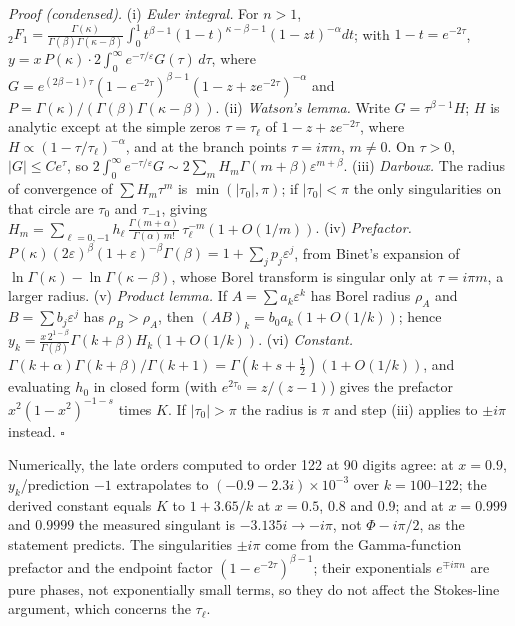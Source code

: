 \documentclass[aps,prd,onecolumn,superscriptaddress,nofootinbib,10pt]{revtex4-2}
\newcommand{\eps}{\varepsilon}
\begin{document}
\emph{Proof (condensed).} (i) \emph{Euler integral.} For $n > 1$,
${}_2F_1 = \frac{\Gamma(\kappa)}{\Gamma(\beta)\Gamma(\kappa-\beta)}\int_0^1 t^{\beta-1}(1-t)^{\kappa-\beta-1}(1-zt)^{-\alpha}dt$; with
$1 - t = e^{-2\tau}$, $y = x\,P(\kappa)\cdot2\int_0^\infty e^{-\tau/\eps}G(\tau)\,d\tau$, where
$G = e^{(2\beta-1)\tau}(1-e^{-2\tau})^{\beta-1}(1-z+ze^{-2\tau})^{-\alpha}$ and $P = \Gamma(\kappa)/(\Gamma(\beta)\Gamma(\kappa-\beta))$.
(ii) \emph{Watson's lemma.} Write $G = \tau^{\beta-1}H$; $H$ is analytic except at the simple zeros $\tau = \tau_\ell$ of
$1 - z + ze^{-2\tau}$, where $H \propto (1-\tau/\tau_\ell)^{-\alpha}$, and at the branch points $\tau = i\pi m$, $m \ne 0$. On
$\tau > 0$, $|G| \le Ce^{\tau}$, so $2\int_0^\infty e^{-\tau/\eps}G \sim 2\sum_m H_m\Gamma(m+\beta)\eps^{m+\beta}$.
(iii) \emph{Darboux.} The radius of convergence of $\sum H_m\tau^m$ is $\min(|\tau_0|, \pi)$; if $|\tau_0| < \pi$ the only singularities on
that circle are $\tau_0$ and $\tau_{-1}$, giving $H_m = \sum_{\ell=0,-1}h_\ell\,\frac{\Gamma(m+\alpha)}{\Gamma(\alpha)\,m!}\,\tau_\ell^{-m}(1+O(1/m))$.
(iv) \emph{Prefactor.} $P(\kappa)(2\eps)^\beta(1+\eps)^{-\beta}\Gamma(\beta) = 1 + \sum_j p_j\eps^j$, from Binet's expansion of
$\ln\Gamma(\kappa) - \ln\Gamma(\kappa-\beta)$, whose Borel transform is singular only at $\tau = i\pi m$, a larger radius.
(v) \emph{Product lemma.} If $A = \sum a_k\eps^k$ has Borel radius $\rho_A$ and $B = \sum b_j\eps^j$ has $\rho_B > \rho_A$, then
$(AB)_k = b_0a_k(1+O(1/k))$; hence $y_k = \frac{x\,2^{1-\beta}}{\Gamma(\beta)}\Gamma(k+\beta)H_k(1+O(1/k))$.
(vi) \emph{Constant.} $\Gamma(k+\alpha)\Gamma(k+\beta)/\Gamma(k+1) = \Gamma(k+s+\frac12)(1+O(1/k))$, and evaluating $h_0$ in closed
form (with $e^{2\tau_0} = z/(z-1)$) gives the prefactor $x^2(1-x^2)^{-1-s}$ times $K$. If $|\tau_0| > \pi$ the radius is $\pi$
and step (iii) applies to $\pm i\pi$ instead. $\square$

Numerically, the late orders computed to order 122 at 90 digits agree: at $x = 0.9$, $y_k$/prediction $- 1$ extrapolates to
$(-0.9 - 2.3i)\times10^{-3}$ over $k = 100$--$122$; the derived constant equals $K$ to $1 + 3.65/k$ at $x = 0.5$, 0.8 and 0.9;
and at $x = 0.999$ and $0.9999$ the measured singulant is $-3.135i \to -i\pi$, not $\Phi - i\pi/2$, as the statement predicts.
The singularities $\pm i\pi$ come from the Gamma-function prefactor and the endpoint factor $(1-e^{-2\tau})^{\beta-1}$; their
exponentials $e^{\mp i\pi n}$ are pure phases, not exponentially small terms, so they do not affect the Stokes-line
argument, which concerns the $\tau_\ell$.
\end{document}
